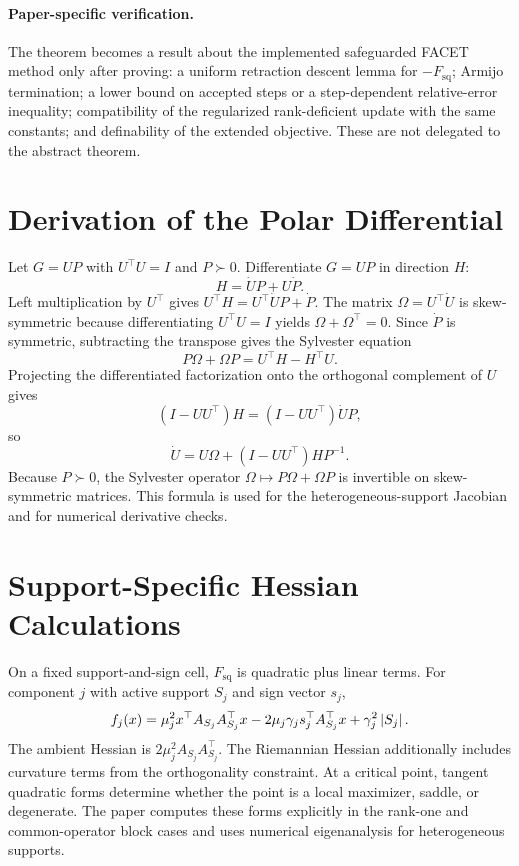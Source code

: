 \paragraph{Paper-specific verification.}
The theorem becomes a result about the implemented safeguarded FACET method only after proving: a uniform retraction descent lemma for $-F_{\mathrm{sq}}$; Armijo termination; a lower bound on accepted steps or a step-dependent relative-error inequality; compatibility of the regularized rank-deficient update with the same constants; and definability of the extended objective. These are not delegated to the abstract theorem.

\section{Derivation of the Polar Differential}
\label{app:a-polar-proof}
Let $G=UP$ with $U^\top U=I$ and $P\succ0$. Differentiate $G=UP$ in direction $H$:
\[
H=\dot U P+U\dot P.
\]
Left multiplication by $U^\top$ gives $U^\top H=U^\top\dot U P+\dot P$. The matrix $\Omega=U^\top\dot U$ is skew-symmetric because differentiating $U^\top U=I$ yields $\Omega+\Omega^\top=0$. Since $\dot P$ is symmetric, subtracting the transpose gives the Sylvester equation
\[
P\Omega+\Omega P=U^\top H-H^\top U.
\]
Projecting the differentiated factorization onto the orthogonal complement of $U$ gives
\[
(I-UU^\top)H=(I-UU^\top)\dot U P,
\]
so
\[
\dot U=U\Omega+(I-UU^\top)HP^{-1}.
\]
Because $P\succ0$, the Sylvester operator $\Omega\mapsto P\Omega+\Omega P$ is invertible on skew-symmetric matrices. This formula is used for the heterogeneous-support Jacobian and for numerical derivative checks.

\section{Support-Specific Hessian Calculations}
On a fixed support-and-sign cell, $F_{\mathrm{sq}}$ is quadratic plus linear terms. For component $j$ with active support $S_j$ and sign vector $s_j$,
\[
f_j(x)=\mu_j^2x^\top A_{S_j}A_{S_j}^\top x
-2\mu_j\gamma_j s_j^\top A_{S_j}^\top x
+\gamma_j^2\left\lvert S_j \right\rvert.
\]
The ambient Hessian is $2\mu_j^2A_{S_j}A_{S_j}^\top$. The Riemannian Hessian additionally includes curvature terms from the orthogonality constraint. At a critical point, tangent quadratic forms determine whether the point is a local maximizer, saddle, or degenerate. The paper computes these forms explicitly in the rank-one and common-operator block cases and uses numerical eigenanalysis for heterogeneous supports.

